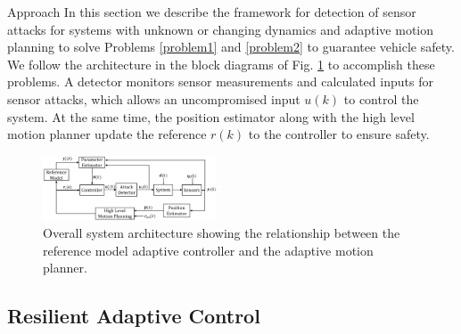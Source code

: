 
\begin{section}{Approach}
\label{sec:approach}
In this section we describe the framework for detection of sensor attacks for systems with unknown or changing dynamics and adaptive motion planning to solve Problems \ref{problem1} and \ref{problem2} to guarantee vehicle safety. We follow the architecture in the block diagrams of Fig. \ref{fig:system_arch} to accomplish these problems. A detector monitors sensor measurements and calculated inputs for sensor attacks, which allows an uncompromised input $u(k)$ to control the system. At the same time, the position estimator along with the high level motion planner update the reference $r(k)$ to the controller to ensure safety.

\begin{figure}[ht!]
\vspace{1pt}
\centering
\includegraphics[width=0.46\textwidth]{sys_arch.png}
\caption{Overall system architecture showing the relationship between the reference model adaptive controller and the adaptive motion planner.}
\label{fig:system_arch}
\end{figure}

\subsection{Resilient Adaptive Control}
\label{sec:Res_adapt_control}


\end{section}

